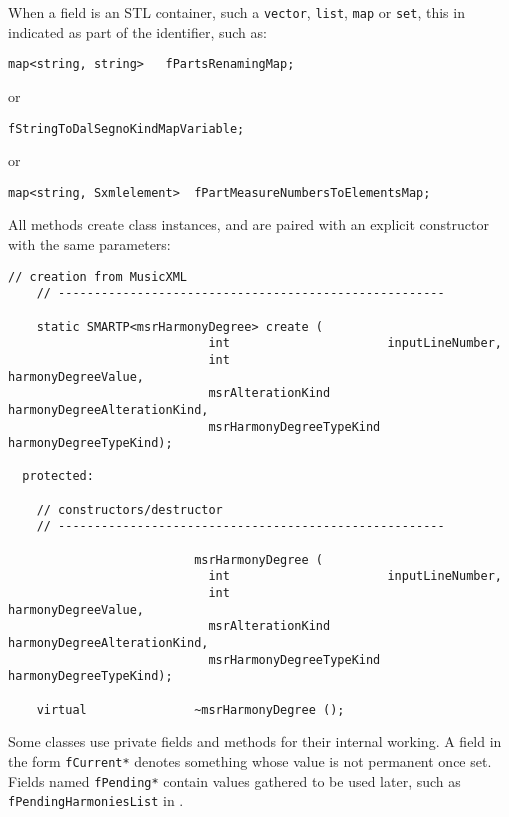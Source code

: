 When a field is an STL container, such a {\tt vector}, {\tt list}, {\tt map} or {\tt set}, this in indicated as part of the identifier, such as:
\begin{lstlisting}[language=CPlusPlus]
    map<string, string>   fPartsRenamingMap;
\end{lstlisting}
or
\begin{lstlisting}[language=CPlusPlus]
                          fStringToDalSegnoKindMapVariable;
\end{lstlisting}
or
\begin{lstlisting}[language=CPlusPlus]
    map<string, Sxmlelement>  fPartMeasureNumbersToElementsMap;
\end{lstlisting}

All  methods create class instances, and are paired with an explicit constructor with the same parameters:
\begin{lstlisting}[language=CPlusPlus]
    // creation from MusicXML
    // ------------------------------------------------------

    static SMARTP<msrHarmonyDegree> create (
                            int                      inputLineNumber,
                            int                      harmonyDegreeValue,
                            msrAlterationKind        harmonyDegreeAlterationKind,
                            msrHarmonyDegreeTypeKind harmonyDegreeTypeKind);

  protected:

    // constructors/destructor
    // ------------------------------------------------------

                          msrHarmonyDegree (
                            int                      inputLineNumber,
                            int                      harmonyDegreeValue,
                            msrAlterationKind        harmonyDegreeAlterationKind,
                            msrHarmonyDegreeTypeKind harmonyDegreeTypeKind);

    virtual               ~msrHarmonyDegree ();
\end{lstlisting}

Some classes use private fields and methods for their internal working. A field in the form {\tt fCurrent*} denotes something whose value is not permanent once set. Fields named {\tt fPending*} contain values gathered to be used later, such as {\tt fPendingHarmoniesList} in .


